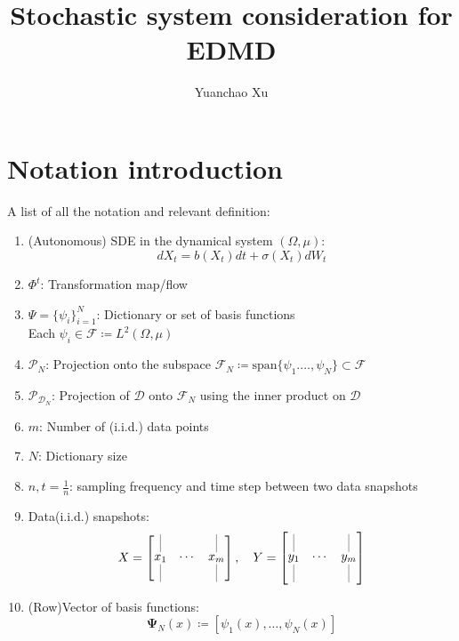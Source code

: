 \documentclass{article}[11]
\title{Stochastic system consideration for EDMD}
\author{Yuanchao Xu}
\begin{document}
\maketitle

\section{Notation introduction}
A list of all the notation and relevant definition:
\begin{enumerate}
	\item (Autonomous) SDE in the dynamical system $(\Omega, \mu)$:
	$$dX_t = b(X_t)dt + \sigma(X_t)dW_t$$
	
	\item $\Phi^{t}$: Transformation map/flow
	
	\item $\Psi = \{\psi_i\}_{i=1}^N$: Dictionary or set of basis functions \\
	Each $\psi_i \in \mathcal{F}\coloneqq L^2(\Omega, \mu)$
	
	\item $\mathcal{P}_{N}$: Projection onto the subspace $\mathcal{F}_N \coloneqq \text{span}\{\psi_1. \dots, \psi_N\}\subset\mathcal{F}$
	
	\item $\mathcal{P}_{\mathcal{D}_N}$: Projection of $\mathcal{D}$ onto $\mathcal{F}_N$ using the inner product on $\mathcal{D}$
	
	
	\item $m$: Number of (i.i.d.) data points
	
	\item $N$: Dictionary size
	
	\item $n,t=\frac{1}{n}$: sampling frequency and time step between two data snapshots
	
	\item Data(i.i.d.) snapshots:
	\[
	X = \begin{bmatrix} 
		\underset{\rule{0.1mm}{5mm}}{\overset{\rule{0.1mm}{5mm}}{x_1}} & \cdots & \underset{\rule{0.1mm}{5mm}}{\overset{\rule{0.1mm}{5mm}}{x_m}}
	\end{bmatrix}
	, \quad
	Y = \begin{bmatrix} 
		\underset{\rule{0.1mm}{5mm}}{\overset{\rule{0.1mm}{5mm}}{y_1}} & \cdots & \underset{\rule{0.1mm}{5mm}}{\overset{\rule{0.1mm}{5mm}}{y_m}}
	\end{bmatrix}
	\]	
	
	\item (Row)Vector of basis functions:
	$$
	\mathbf{\Psi}_N(x) \coloneqq \left[\psi_1(x), \dots, \psi_N(x)\right]
	$$
	

\end{enumerate}
\end{document}
